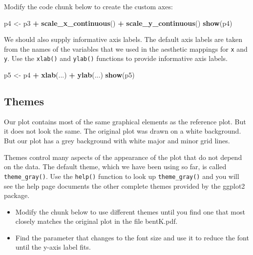 \documentclass[
]{book}
\newenvironment{Shaded}{\begin{snugshade}}{\end{snugshade}}
\newcommand{\FunctionTok}[1]{\textcolor[rgb]{0.13,0.29,0.53}{\textbf{#1}}}
\newcommand{\NormalTok}[1]{#1}
\newcommand{\OtherTok}[1]{\textcolor[rgb]{0.56,0.35,0.01}{#1}}
\newcommand{\SpecialCharTok}[1]{\textcolor[rgb]{0.81,0.36,0.00}{\textbf{#1}}}
\providecommand{\tightlist}{%
  \setlength{\itemsep}{0pt}\setlength{\parskip}{0pt}}
\begin{document}
Modify the code chunk below to create the custom axes:

\begin{Shaded}
\begin{Highlighting}[]
\NormalTok{p4 }\OtherTok{\textless{}{-}}\NormalTok{ p3 }\SpecialCharTok{+} \FunctionTok{scale\_x\_continuous}\NormalTok{() }\SpecialCharTok{+} \FunctionTok{scale\_y\_continuous}\NormalTok{()}
\FunctionTok{show}\NormalTok{(p4)}
\end{Highlighting}
\end{Shaded}

We should also supply informative axis labels. The default axis labels are taken from the names of the variables that we used in the aesthetic mappings for \texttt{x} and \texttt{y}. Use the \texttt{xlab()} and \texttt{ylab()} functions to provide informative axis labels.

\begin{Shaded}
\begin{Highlighting}[]
\NormalTok{p5 }\OtherTok{\textless{}{-}}\NormalTok{ p4 }\SpecialCharTok{+} \FunctionTok{xlab}\NormalTok{(...) }\SpecialCharTok{+} \FunctionTok{ylab}\NormalTok{(...)}
\FunctionTok{show}\NormalTok{(p5)}
\end{Highlighting}
\end{Shaded}

\subsection{Themes}\label{themes}

Our plot contains most of the same graphical elements as the reference plot. But it does not look the same. The original plot was drawn on a white background. But our plot has a grey background with white major and minor grid lines.

Themes control many aspects of the appearance of the plot that do not depend on the data. The default theme, which we have been using so far, is called \texttt{theme\_gray()}. Use the \texttt{help()} function to look up \texttt{theme\_gray()} and you will see the help page documents the other complete themes provided by the ggplot2 package.

\begin{itemize}
\tightlist
\item
  Modify the chunk below to use different themes until you find one that most closely matches the original plot in the file bentK.pdf.
\item
  Find the parameter that changes to the font size and use it to reduce the font until the y-axis label fits.
\end{itemize}
\end{document}
